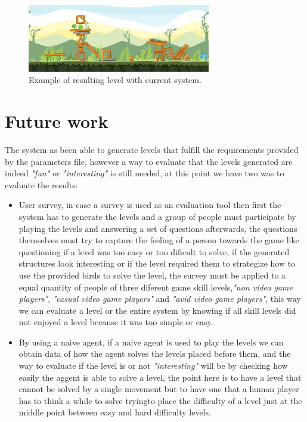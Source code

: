 \documentclass[conference]{IEEEtran}
\begin{document}
\begin{figure}[htbp]
    \centerline{\includegraphics[width=80mm]{Images/Result_n2.png}}
    \caption{Example of resulting level with current system.}
    \label{result_1}
\end{figure}

\section{Future work}

The system as been able to generate levels that fulfill the requirements
 provided by the parameters file, however a way to evaluate that the levels
 generated are indeed \textit{"fun"} or \textit{"interesting"} is still needed,
 at this point we have two was to evaluate the results:
 \begin{itemize}
    \item User survey, in case a survey is used as an evaluation tool then first
    the system has to generate the levels and a group of people must participate
    by playing the levels and answering a set of questions afterwards, the
    questions themselves must try to capture the feeling of a person towards the
    game like questioning if a level was too easy or too dificult to solve, if
    the generated structures look interesting or if the level required them to
    strategize how to use the provided birds to solve the level, the survey must
    be applied to a equal quantity of people of three diferent game skill
    levels,\textit{"non video game players"}, \textit{"casual video game
    players"} and \textit{"avid video game players"}, this way we can evaluate a
    level or the entire system by knowing if all skill levels did not enjoyed a
    level because it was too simple or easy.
    \item By using a naive agent, if a naive agent is used to play the levels we
    can obtain data of how the agent solves the levels placed before them, and
    the way to evaluate if the level is or not \textit{"interesting"} will be by
    checking how easily the aggent is able to solve a level, the point here is
    to have a level that cannot be solved by a single movement but to have one
    that a human player has to think a while to solve tryingto place the
    difficulty of a level just at the middle point between easy and hard
    difficulty levels.
\end{itemize}
\end{document}
